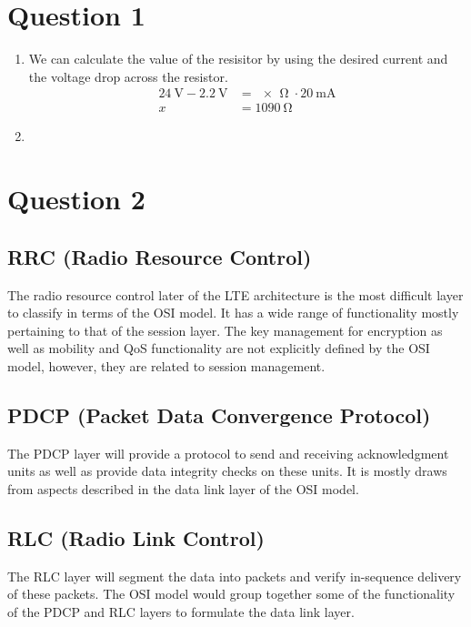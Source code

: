 \documentclass[12pt,letterpaper]{article}
\begin{document}
\section*{Question 1}

\begin{enumerate}[label=\alph*)]
  \item
  We can calculate the value of the resisitor by using the desired current and the voltage drop across the resistor.
   \begin{align*}
   \SI{24}{\volt} - \SI{2.2}{\volt} &= \SI[parse-numbers=false]{x}{\ohm}\cdot\SI{20}{\milli \ampere}\\
   x &= \SI{1090}{\ohm}
   \end{align*}
  \item
   
\end{enumerate}

\section*{Question 2}
\subsection*{RRC (Radio Resource Control)}
The radio resource control later of the LTE architecture is the most difficult
layer to classify in terms of the OSI model. It has a wide range of functionality
mostly pertaining to that of the session layer. The key management for encryption
as well as mobility and QoS functionality are not explicitly defined by the OSI
model, however, they are related to session management.

\subsection*{PDCP (Packet Data Convergence Protocol)}
The PDCP layer will provide a protocol to send and receiving acknowledgment
units as well as provide data integrity checks on these units. It is mostly draws
from aspects described in the data link layer of the OSI model.

\subsection*{RLC (Radio Link Control)}
The RLC layer will segment the data into packets and verify in-sequence delivery
of these packets. The OSI model would group together some of the functionality of
the PDCP and RLC layers to formulate the data link layer.
\end{document}
